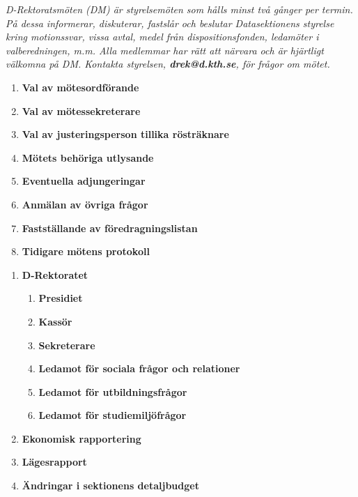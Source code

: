 \documentclass{dagordning}
\begin{document}
{\small \textit{D-Rektoratsmöten (DM) är styrelsemöten som hålls minst två gånger per termin. På dessa informerar, diskuterar, fastslår och beslutar Datasektionens styrelse kring motionssvar, vissa avtal, medel från dispositionsfonden, ledamöter i valberedningen, m.m. Alla medlemmar  har rätt att närvara och är hjärtligt välkomna på DM. Kontakta styrelsen, \textit{\textbf{drek@d.kth.se}}, för frågor om mötet.}} %



  \begin{enumerate}
    \item \textbf{Val av mötesordförande}
    \item \textbf{Val av mötessekreterare}
    \item \textbf{Val av justeringsperson tillika rösträknare}
    \item \textbf{Mötets behöriga utlysande}
    \item \textbf{Eventuella adjungeringar}
    \item \textbf{Anmälan av övriga frågor}
    \item \textbf{Fastställande av föredragningslistan}
    \item \textbf{Tidigare mötens protokoll}
  \end{enumerate}


  \begin{enumerate}
    \item \textbf{D-Rektoratet}
	\begin{enumerate}
        \item \textbf{Presidiet}
        \item \textbf{Kassör}
        \item \textbf{Sekreterare}
        \item \textbf{Ledamot för sociala frågor och relationer}
        \item \textbf{Ledamot för utbildningsfrågor}
        \item \textbf{Ledamot för studiemiljöfrågor}
	\end{enumerate}
    \item \textbf{Ekonomisk rapportering}
        \item \textbf{Lägesrapport}
        \item \textbf{Ändringar i sektionens detaljbudget}
  \end{enumerate}


\end{document}
